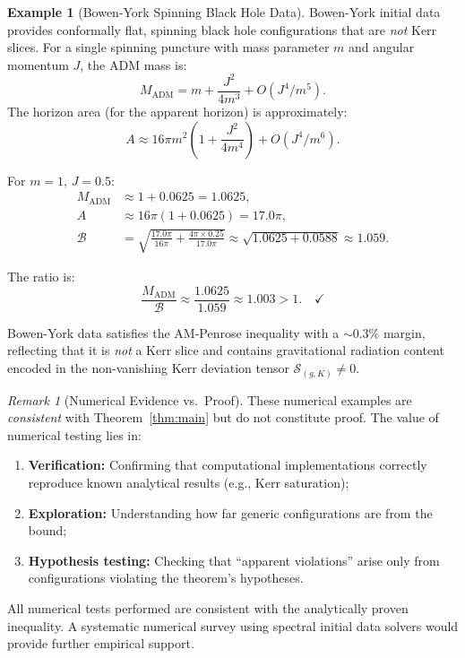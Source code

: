 \documentclass[12pt]{article}
\theoremstyle{plain}
\theoremstyle{definition}
\newtheorem{example}[theorem]{Example}
\theoremstyle{remark}
\newtheorem{remark}[theorem]{Remark}
\newcommand{\ADM}{\mathrm{ADM}}
\begin{document}
\begin{example}[Bowen-York Spinning Black Hole Data]\label{ex:bowen-york}
Bowen-York initial data \cite{bowen1980} provides conformally flat, spinning black hole configurations that are \emph{not} Kerr slices. For a single spinning puncture with mass parameter $m$ and angular momentum $J$, the ADM mass is:
\[
M_{\ADM} = m + \frac{J^2}{4m^3} + O(J^4/m^5).
\]
The horizon area (for the apparent horizon) is approximately:
\[
A \approx 16\pi m^2 \left(1 + \frac{J^2}{4m^4}\right) + O(J^4/m^6).
\]

For $m = 1$, $J = 0.5$:
\begin{align*}
M_{\ADM} &\approx 1 + 0.0625 = 1.0625, \\
A &\approx 16\pi(1 + 0.0625) = 17.0\pi, \\
\mathcal{B} &= \sqrt{\frac{17.0\pi}{16\pi} + \frac{4\pi \times 0.25}{17.0\pi}} \approx \sqrt{1.0625 + 0.0588} \approx 1.059.
\end{align*}

The ratio is:
\[
\frac{M_{\ADM}}{\mathcal{B}} \approx \frac{1.0625}{1.059} \approx 1.003 > 1. \quad \checkmark
\]

Bowen-York data satisfies the AM-Penrose inequality with a $\sim$0.3\% margin, reflecting that it is \emph{not} a Kerr slice and contains gravitational radiation content encoded in the non-vanishing Kerr deviation tensor $\mathcal{S}_{(g,K)} \neq 0$.
\end{example}

\begin{remark}[Numerical Evidence vs.\ Proof]
These numerical examples are \emph{consistent} with Theorem~\ref{thm:main} but do not constitute proof. The value of numerical testing lies in:
\begin{enumerate}[label=(\arabic*)]
    \item \textbf{Verification:} Confirming that computational implementations correctly reproduce known analytical results (e.g., Kerr saturation);
    \item \textbf{Exploration:} Understanding how far generic configurations are from the bound;
    \item \textbf{Hypothesis testing:} Checking that ``apparent violations'' arise only from configurations violating the theorem's hypotheses.
\end{enumerate}
All numerical tests performed are consistent with the analytically proven inequality. A systematic numerical survey using spectral initial data solvers would provide further empirical support.
\end{remark}
\end{document}

